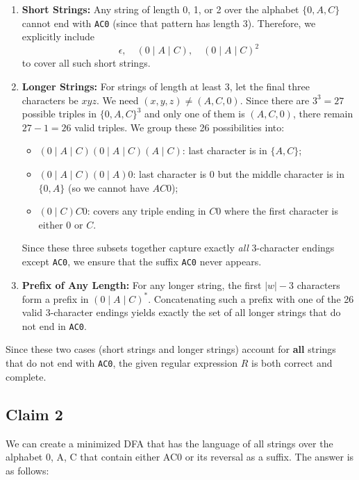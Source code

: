 \documentclass[sigconf,anonymous,review]{acmart}
\begin{document}
\begin{enumerate}
  \item \textbf{Short Strings:} 
  Any string of length 0, 1, or 2 over the alphabet \(\{0,A,C\}\) cannot end with \texttt{AC0} (since that pattern has length 3). Therefore, we explicitly include
  \[
    \epsilon, \quad (0 \mid A \mid C), \quad (0 \mid A \mid C)^2
  \]
  to cover all such short strings.

  \item \textbf{Longer Strings:} 
  For strings of length at least 3, let the final three characters be \(x y z\). We need \((x,y,z)\neq (A,C,0)\). 
  Since there are \(3^3=27\) possible triples in \(\{0,A,C\}^3\) and only one of them is \((A,C,0)\), there remain \(27-1=26\) valid triples. We group these 26 possibilities into:
  \begin{itemize}
    \item \((0 \mid A \mid C)(0 \mid A \mid C)(A \mid C)\): last character is in \(\{A,C\}\);
    \item \((0 \mid A \mid C)(0 \mid A)0\): last character is 0 but the middle character is in \(\{0,A\}\) (so we cannot have \(AC0\));
    \item \((0 \mid C)C0\): covers any triple ending in \(C0\) where the first character is either \(0\) or \(C\).
  \end{itemize}
  Since these three subsets together capture exactly \textit{all} 3-character endings except \texttt{AC0}, we ensure that the suffix \texttt{AC0} never appears.

  \item \textbf{Prefix of Any Length:}
  For any longer string, the first \(|w|-3\) characters form a prefix in \((0 \mid A \mid C)^*\). Concatenating such a prefix with one of the 26 valid 3-character endings yields exactly the set of all longer strings that do not end in \texttt{AC0}.
\end{enumerate}

Since these two cases (short strings and longer strings) account for \textbf{all} strings that do not end with \texttt{AC0}, the given regular expression $R$ is both correct and complete.



\subsection{Claim 2}

We can create a minimized DFA that has the language of all strings over the alphabet {0, A, C} that contain either AC0 or its reversal as a suffix.
The answer is as follows:
\end{document}
